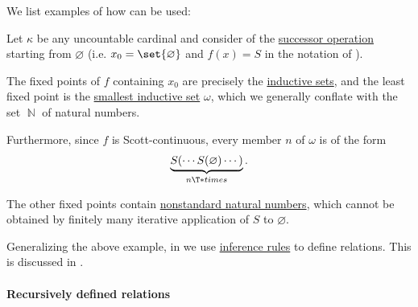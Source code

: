 \begin{example}\label{ex:thm:knaster_tarski_iteration}
  We list examples of how  can be used:
  \begin{thmenum}
     Let \( \kappa \) be any uncountable cardinal and consider  of the \hyperref[def:ordinal_successor]{successor operation} starting from \( \varnothing \) (i.e. \( x_0 = \set{ \varnothing } \) and  \( f(x) = S \) in the notation of ).

    The fixed points of \( f \) containing \( x_0 \) are precisely the \hyperref[def:inductive_set]{inductive sets}, and the least fixed point is the \hyperref[def:smallest_inductive_set]{smallest inductive set} \( \omega \), which we generally conflate with the set \( \BbbN \) of natural numbers.

    Furthermore, since \( f \) is Scott-continuous, every member \( n \) of \( \omega \) is of the form
    \begin{equation*}
      \underbrace{ S( \cdots S(\varnothing) \cdots ) }_{n \T*{times}}.
    \end{equation*}

    The other fixed points contain \hyperref[def:peano_arithmetic_standard_model]{nonstandard natural numbers}, which cannot be obtained by finitely many iterative application of \( S \) to \( \varnothing \).

     Generalizing the above example, in  we use \hyperref[def:inference_rule]{inference rules} to define relations. This is discussed in .
  \end{thmenum}
\end{example}

\paragraph{Recursively defined relations}

